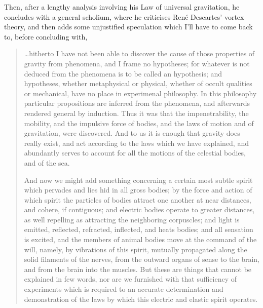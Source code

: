 Then, after a lengthy analysis involving his Law of universal gravitation, he concludes with a general scholium, where he criticises Ren\'{e} Descartes' vortex theory, and then adds some unjustified speculation which I'll have to come back to, before concluding with,
\begin{quotation}
\ldots hitherto I have not been able to discover the cause of those properties of gravity from phenomena, and I frame no hypotheses; for whatever is not deduced from the phenomena is to be called an hypothesis; and hypotheses, whether metaphysical or physical, whether of occult qualities or mechanical, have no place in experimenal philosophy. In this philosophy particular propositions are inferred from the phenomena, and afterwards rendered general by induction. Thus it was that the impenetrability, the mobility, and the impulsive force of bodies, and the laws of motion and of gravitation, were discovered. And to us it is enough that gravity does really exist, and act according to the laws which we have explained, and abundantly serves to account for all the motions of the celestial bodies, and of the sea.

And now we might add something concerning a certain most subtle spirit which pervades and lies hid in all gross bodies; by the force and action of which spirit the particles of bodies attract one another at near distances, and cohere, if contiguous; and electric bodies operate to greater distances, as well repelling as attracting the neighboring corpuscles; and light is emitted, reflected, refracted, inflected, and heats bodies; and all sensation is excited, and the members of animal bodies move at the command of the will, namely, by vibrations of this spirit, mutually propagated along the solid filaments of the nerves, from the outward organs of sense to the brain, and from the brain into the muscles. But these are things that cannot be explained in few words, nor are we furnished with that sufficiency of experiments which is required to an accurate determination and demonstration of the laws by which this electric and elastic spirit operates.
\end{quotation}

